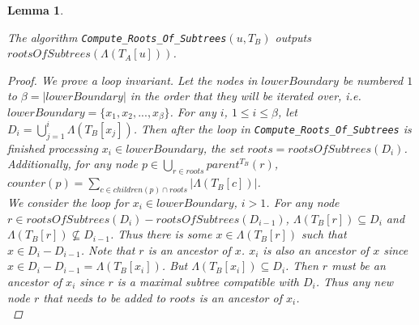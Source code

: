 \documentclass{article}
\newcommand{\leafset}{\Lambda}
\newtheorem{computerootsofsubtreescorrectness}[incompatibility]{Lemma}
\begin{document}
    \begin{computerootsofsubtreescorrectness}
        \label{lem:computerootsofsubtreescorrectness}

        The algorithm \texttt{Compute\_Roots\_Of\_Subtrees}$(u, T_B)$ outputs $rootsOfSubtrees(\leafset(T_A[u]))$.

        \begin{proof}
            We prove a loop invariant. Let the nodes in $lowerBoundary$ be numbered $1$ to $\beta = |lowerBoundary|$ in the order that they will be iterated over, i.e. $lowerBoundary = \{x_1, x_2, ..., x_{\beta}\}$. For any $i$, $1 \leq i \leq \beta$, let $D_i = \bigcup_{j = 1}^{i} \leafset(T_B[x_j])$. Then after the loop in \texttt{Compute\_Roots\_Of\_Subtrees} is finished processing $x_i \in lowerBoundary$, the set $roots = rootsOfSubtrees(D_i)$. Additionally, for any node $p \in \bigcup_{r \in roots} parent^{T_B}(r)$, $counter(p) = \sum_{c \in children(p) \cap roots} |\leafset(T_B[c])|$.\\

            We consider the loop for $x_i \in lowerBoundary$, $i > 1$. For any node $r \in rootsOfSubtrees(D_i) - rootsOfSubtrees(D_{i-1})$, $\leafset(T_B[r]) \subseteq D_i$ and $\leafset(T_B[r]) \not\subseteq D_{i-1}$. Thus there is some $x \in \leafset(T_B[r])$ such that $x \in D_i - D_{i-1}$. Note that $r$ is an ancestor of $x$. $x_i$ is also an ancestor of $x$ since $x \in D_i - D_{i-1} = \leafset(T_B[x_i])$. But $\leafset(T_B[x_i]) \subseteq D_i$. Then $r$ must be an ancestor of $x_i$ since $r$ is a maximal subtree compatible with $D_i$. Thus any new node $r$ that needs to be added to $roots$ is an ancestor of $x_i$.\\


\end{proof}
\end{computerootsofsubtreescorrectness}
\end{document}
